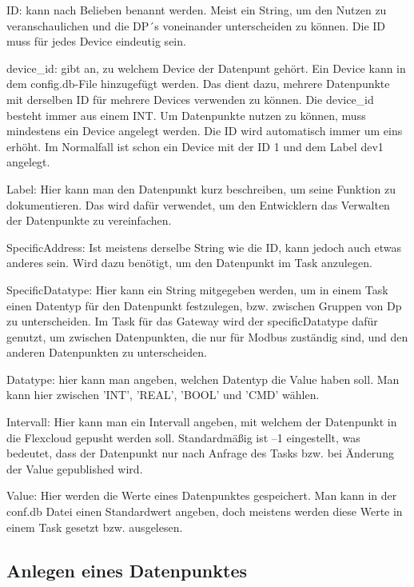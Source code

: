 \begin{compactitem}
    \item ID: kann nach Belieben benannt werden. Meist ein String, um den Nutzen zu veranschaulichen und die DP´s voneinander unterscheiden zu können. Die ID muss für jedes Device eindeutig sein. \label{text:deviceId}
    \item device\_id: gibt an, zu welchem Device der Datenpunt gehört. Ein Device kann in dem config.db-File hinzugefügt werden. Das dient dazu, mehrere Datenpunkte mit derselben ID für mehrere Devices verwenden zu können. Die device\_id besteht immer aus einem INT. Um Datenpunkte nutzen zu können, muss mindestens ein Device angelegt werden. Die ID wird automatisch immer um eins erhöht. Im Normalfall ist schon ein Device mit der ID 1 und dem Label dev1 angelegt.
    \item Label: Hier kann man den Datenpunkt kurz beschreiben, um seine Funktion zu dokumentieren. Das wird dafür verwendet, um den Entwicklern das Verwalten der Datenpunkte zu vereinfachen.
    \item SpecificAddress: Ist meistens derselbe String wie die ID, kann jedoch auch etwas anderes sein. Wird dazu benötigt, um den Datenpunkt im Task anzulegen.
    \item SpecificDatatype: Hier kann ein String mitgegeben werden, um in einem Task einen Datentyp für den Datenpunkt festzulegen, bzw. zwischen Gruppen von Dp zu unterscheiden. Im Task für das Gateway wird der specificDatatype dafür genutzt, um zwischen Datenpunkten, die nur für Modbus zuständig sind, und den anderen Datenpunkten zu unterscheiden. \label{text:specificDatatype}
    \item Datatype: hier kann man angeben, welchen Datentyp die Value haben soll. Man kann hier zwischen 'INT', 'REAL', 'BOOL' und 'CMD' wählen.
    \item Intervall: Hier kann man ein Intervall angeben, mit welchem der Datenpunkt in die Flexcloud gepusht werden soll. Standardmäßig ist –1 eingestellt, was bedeutet, dass der Datenpunkt nur nach Anfrage des Tasks bzw. bei Änderung der Value gepublished wird.
    \item Value: Hier werden die Werte eines Datenpunktes gespeichert. Man kann in der conf.db Datei einen Standardwert angeben, doch meistens werden diese Werte in einem Task gesetzt bzw. ausgelesen.
\end{compactitem}

\subsection{Anlegen eines Datenpunktes} 



